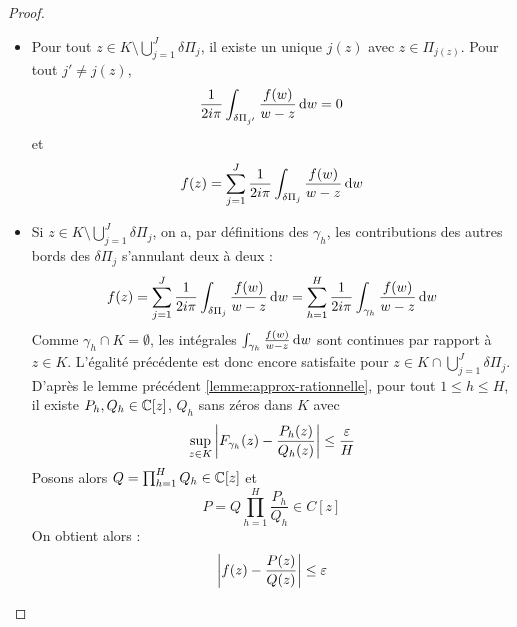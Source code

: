 \documentclass{cours}
\begin{document}
\begin{proof}
\begin{itemize}
        \item Pour tout $z \in K \setminus \bigcup\limits_{j = 1}^{J} \delta\Pi_{j}$, il existe un unique $j(z)$ avec $z \in \Pi_{j(z)}$. Pour tout $j' \neq j(z)$, 
        \[
            \frac{1}{2i\pi} \int_{\delta\Pi_{j'}}\frac{f(w)}{w-z}{\rm \, d} w = 0
        \]
        et 
        \[
            f(z) = \sum_{j = 1}^{J}\frac{1}{2i\pi}\int_{\delta\Pi_{j}}\frac{f(w)}{w-z}{\rm \, d} w
        \]
        \item Si $z \in K \setminus \bigcup_{j = 1}^{J}\delta \Pi_{j}$, on a, par définitions des $\gamma_{h}$, les contributions des autres bords des $\delta \Pi_{j}$ s'annulant deux à deux : 
        \[
            f(z) = \sum_{j = 1}^{J}\frac{1}{2i\pi} \int_{\delta \Pi_{j}}\frac{f(w)}{w - z}{\rm \, d} w = \sum_{h = 1}^{H}\frac{1}{2i\pi}\int_{\gamma_{h}}\frac{f(w)}{w-z} {\rm \, d} w
        \]
        Comme $\gamma_{h} \cap K = \emptyset$, les intégrales $\int_{\gamma_{h}}\frac{f(w)}{w-z} {\rm \, d} w$ sont continues par rapport à $z \in K$. L'égalité précédente est donc encore satisfaite pour $z \in K \cap \bigcup_{j = 1}^{J} \delta \Pi_{j}$.\\
        D'après le lemme précédent \ref{lemme:approx-rationnelle}, pour tout $1 \leq h \leq H$, il existe $P_{h}, Q_{h} \in \mathbb{C}[z]$, $Q_{h}$ sans zéros dans $K$ avec
        \[
            \sup_{z \in K}\left|F_{\gamma_{h}}(z) - \frac{P_{h}(z)}{Q_{h}(z)}\right| \leq \frac{\varepsilon}{H}
        \]
        Posons alors $Q = \prod_{h = 1}^{H}Q_{h} \in \mathbb{C}[z]$ et 
        \[
            P = Q\prod_{h = 1}^{H}\frac{P_{h}}{Q_{h}} \in C[z]
        \]
        On obtient alors : 
        \[
            \left|f(z) - \frac{P(z)}{Q(z)}\right| \leq \varepsilon
        \]
    \end{itemize}
\end{proof}
\end{document}
